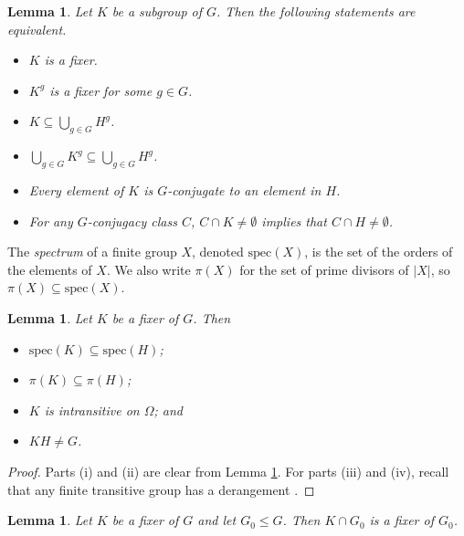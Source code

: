 \documentclass[twoside,a4paper,reqno,11pt]{amsart}
\newcommand{\<}{\langle}
\renewcommand{\>}{\rangle}
\newcommand{\leqs}{\leqslant}
\newcommand{\Spec}{\mathrm{spec}}
\newtheorem{lem}[thm]{Lemma}
\theoremstyle{definition}
\begin{document}
	\begin{lem}
		\label{l:pre_iff}
		Let $K$ be a subgroup of $G$. Then the following statements are equivalent.
		\begin{itemize}\addtolength{\itemsep}{0.2\baselineskip}
			\item[{\rm (i)}] $K$ is a fixer.
			\item[{\rm (ii)}] $K^g$ is a fixer for some $g\in G$.
			\item[{\rm (iii)}] $K\subseteq \bigcup_{g\in G}H^g$.
			\item[{\rm (iv)}] $\bigcup_{g\in G}K^g\subseteq \bigcup_{g\in G}H^g$.
			\item[{\rm (v)}] Every element of $K$ is $G$-conjugate to an element in $H$.
			\item[{\rm (vi)}] For any $G$-conjugacy class $C$, $C\cap K\ne \emptyset$ implies that $C\cap H\ne \emptyset$.
		\end{itemize}
	\end{lem}
	
	The \textit{spectrum} of a finite group $X$, denoted $\Spec(X)$, is the set of the orders of the elements of $X$. We also write $\pi(X)$ for the set of prime divisors of $|X|$, so $\pi(X)\subseteq\Spec(X)$.
	
	\begin{lem}
		\label{l:pre_fix}
		Let $K$ be a fixer of $G$. Then
		\begin{itemize}\addtolength{\itemsep}{0.2\baselineskip}
			\item[{\rm (i)}] $\Spec(K)\subseteq \Spec(H)$;
			\item[{\rm (ii)}] $\pi(K)\subseteq \pi(H)$;
			\item[{\rm (iii)}] $K$ is intransitive on $\Omega$; and
			\item[{\rm (iv)}] $KH\ne G$.
		\end{itemize}
	\end{lem}
	
	
	\begin{proof}
		Parts (i) and (ii) are clear from Lemma \ref{l:pre_iff}. For parts (iii) and (iv), recall that any finite transitive group has a derangement \cite{J_der}.
	\end{proof}
	
	
	\begin{lem}
		\label{l:pre_red}
		Let $K$ be a fixer of $G$ and let $G_0\leqs G$. Then $K\cap G_0$ is a fixer of $G_0$.
	\end{lem}
	
	
	
\end{document}
